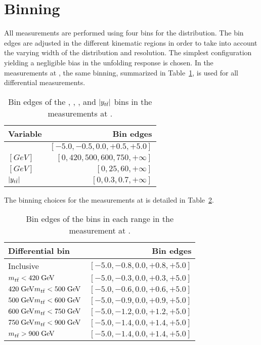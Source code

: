 \section{Binning}
\label{app:unfolding:binning}

All measurements are performed using four bins for the \dy{}
distribution.
The bin edges are adjusted in the different kinematic regions in order
to take into account the varying width of the distribution and \dy{}
resolution. The simplest configuration yielding a negligible bias in
the unfolding response is chosen. In the measurements at \seventev{},
the same \dy{} binning, summarized in Table~\ref{tab:unf:binning7tev},
is used for all differential measurements. 
\begin{table}[htbp]
  \begin{center}
    \begin{tabular}{l  r}
      \toprule
      Variable &  Bin edges \\
      \midrule
      \dy{}                     & $[-5.0, -0.5, 0.0, +0.5, +5.0]$ \\
      \mtt{} $[GeV]$ & $[0, 420, 500, 600, 750,
      +\infty{}]$ \\
      \pttt{} $[GeV]$ & $[0, 25, 60, +\infty{}]$ \\
      $|y_{t\bar{t}}{}|$                 & $[0, 0.3, 0.7, +\infty{}]$ \\
      \bottomrule
     \end{tabular}
   \end{center}
  \caption{Bin edges of the \dy{}, \mtt{}, \pttt{}, and $|y_{t\bar{t}}{}|$
  bins in the measurements at \seventev{}.}
  \label{tab:unf:binning7tev}
\end{table}
The binning choices for the measurements at \eighttev{} is detailed in
Table~\ref{tab:unf:binning8tev}.
\begin{table}[htbp]
  \begin{center}
    \begin{tabular}{l r}
      \toprule
      Differential bin & Bin edges \\
      \midrule
      Inclusive & $[-5.0, -0.8, 0.0, +0.8, +5.0]$ \\
      \midrule
      $m_{t\bar{t}}{}<420\; \mathrm{GeV}{}$ & $[-5.0, -0.3, 0.0, +0.3, +5.0]$ \\
      $420\; \mathrm{GeV}{}m_{t\bar{t}}{}<500\; \mathrm{GeV}{}$ & $[-5.0, -0.6, 0.0, +0.6, +5.0]$ \\
      $500\; \mathrm{GeV}{}m_{t\bar{t}}{}<600\; \mathrm{GeV}{}$ & $[-5.0, -0.9, 0.0, +0.9, +5.0]$ \\
      $600\; \mathrm{GeV}{}m_{t\bar{t}}{}<750\; \mathrm{GeV}{}$ & $[-5.0, -1.2, 0.0, +1.2, +5.0]$ \\
      $750\; \mathrm{GeV}{}m_{t\bar{t}}{}<900\; \mathrm{GeV}{}$ & $[-5.0, -1.4, 0.0, +1.4, +5.0]$ \\
      $m_{t\bar{t}}{}>900\; \mathrm{GeV}{}$ & $[-5.0, -1.4, 0.0, +1.4, +5.0]$ \\
      \bottomrule
     \end{tabular}
   \end{center}
  \caption{Bin edges of the \dy{} bins in each \mtt{} range in the
    measurement at \eighttev{}.}
  \label{tab:unf:binning8tev}
\end{table}

